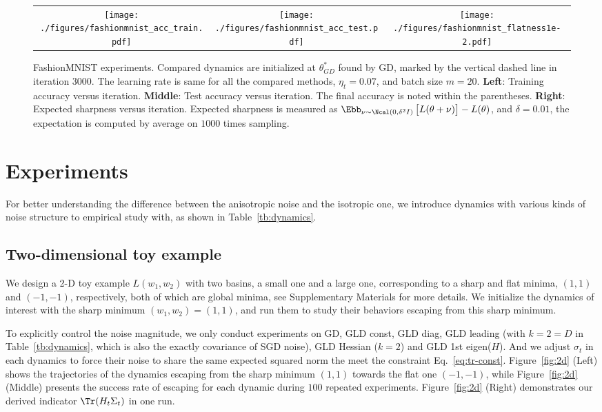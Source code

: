 \documentclass{article}
\begin{document}
\begin{figure*}
\centering
\begin{tabular}{ccc}
    \texttt{[image: ./figures/fashionmnist\_acc\_train.pdf]} &  \texttt{[image: ./figures/fashionmnist\_acc\_test.pdf]} & \texttt{[image: ./figures/fashionmnist\_flatness1e-2.pdf]}
\end{tabular}
\vspace{-4mm}
\caption{\small FashionMNIST experiments. Compared dynamics are initialized at $\theta^*_{GD}$ found by GD, marked by the vertical dashed line in iteration $3000$. The learning rate is same for all the compared methods, $\eta_t = 0.07$, and batch size $m=20$.
\textbf{Left}: Training accuracy versus iteration.
\textbf{Middle}: Test accuracy versus iteration. The final accuracy is noted within the parentheses.
\textbf{Right}: Expected sharpness versus iteration. Expected sharpness is measured as $\Ebb_{\nu \sim \Ncal(0, \delta^2 I)} \left[ L(\theta + \nu)\right] - L(\theta)$, and $\delta=0.01$, the expectation is computed by average on $1000$ times sampling.}
\label{fig:fashion}
\vspace{-4mm}
\end{figure*}

\section{Experiments}
\label{sec:exp}

For better understanding the difference between the anisotropic noise and the isotropic one, we introduce dynamics with various kinds of noise structure to empirical study with, as shown in Table~\ref{tb:dynamics}.


\subsection{Two-dimensional toy example}
We design a 2-D toy example  $L(w_1, w_2)$ with two basins, a small one and a large one, corresponding to a sharp and flat minima, $(1,1)$ and $(-1,-1)$, respectively, both of which are global minima, see Supplementary Materials for more details.
We initialize the dynamics of interest with the sharp minimum $(w_1, w_2) = (1,1)$, and run them to study their behaviors escaping from this sharp minimum.

To explicitly control the noise magnitude, we only conduct experiments on GD, GLD const, GLD diag, GLD leading (with $k=2=D$ in Table~\ref{tb:dynamics}, which is also the exactly covariance of SGD noise), GLD Hessian ($k=2$) and GLD 1st eigen($H$).
And we adjust $\sigma_t$ in each dynamics to force their noise to share the same expected squared norm the meet the constraint Eq.~\eqref{eq:tr-const}.
Figure~\ref{fig:2d} (Left) shows the trajectories of the dynamics escaping from the sharp minimum $(1,1)$ towards the flat one $(-1,-1)$, while Figure~\ref{fig:2d} (Middle) presents the success rate of escaping for each dynamic during $100$ repeated experiments. Figure~\ref{fig:2d} (Right) demonstrates our derived indicator $\Tr(H_t\Sigma_t)$ in one run.
\end{document}
